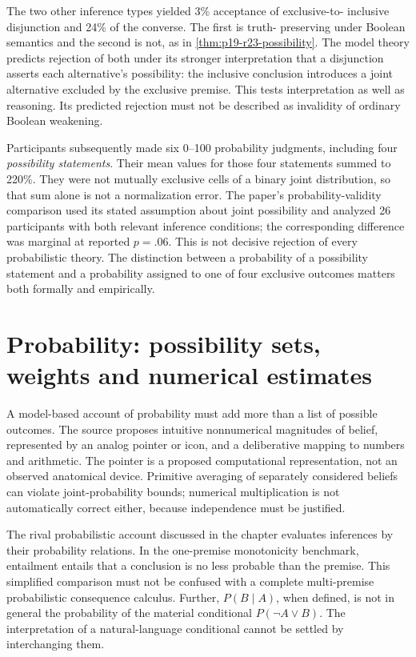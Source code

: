 The two other inference types yielded 3\% acceptance of exclusive-to-
inclusive disjunction and 24\% of the converse. The first is truth-
preserving under Boolean semantics and the second is not, as in
\cref{thm:p19-r23-possibility}. The model theory predicts rejection of
both under its stronger interpretation that a disjunction asserts each
alternative's possibility: the inclusive conclusion introduces a joint
alternative excluded by the exclusive premise. This tests interpretation
as well as reasoning. Its predicted rejection must not be described as
invalidity of ordinary Boolean weakening.

Participants subsequently made six 0--100 probability judgments,
including four \emph{possibility statements}. Their mean values for those
four statements summed to 220\%. They were not mutually exclusive
cells of a binary joint distribution, so that sum alone is not a
normalization error. The paper's probability-validity comparison used
its stated assumption about joint possibility and analyzed 26 participants
with both relevant inference conditions; the corresponding difference
was marginal at reported \(p=.06\). This is not decisive rejection of
every probabilistic theory. The distinction between a probability of a
possibility statement and a probability assigned to one of four exclusive
outcomes matters both formally and empirically.

\section{Probability: possibility sets, weights and numerical estimates}
\label{sec:p19-r23-probability}

A model-based account of probability must add more than a list of possible
outcomes. The source proposes intuitive nonnumerical magnitudes of belief,
represented by an analog pointer or icon, and a deliberative mapping to
numbers and arithmetic. The pointer is a proposed computational
representation, not an observed anatomical device. Primitive averaging
of separately considered beliefs can violate joint-probability bounds;
numerical multiplication is not automatically correct either, because
independence must be justified.

The rival probabilistic account discussed in the chapter evaluates
inferences by their probability relations. In the one-premise monotonicity
benchmark, entailment entails that a conclusion is no less probable than
the premise. This simplified comparison must not be confused with a
complete multi-premise probabilistic consequence calculus. Further,
\(P(B\mid A)\), when defined, is not in general the probability of the
material conditional \(P(\neg A\lor B)\). The interpretation of a
natural-language conditional cannot be settled by interchanging them.

